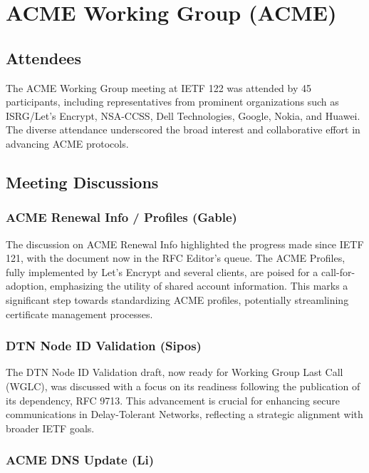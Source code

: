\documentclass{article}
\begin{document}
\section{ACME Working Group (ACME)}

\subsection{Attendees}

The ACME Working Group meeting at IETF 122 was attended by 45 participants, including representatives from prominent organizations such as ISRG/Let's Encrypt, NSA-CCSS, Dell Technologies, Google, Nokia, and Huawei. The diverse attendance underscored the broad interest and collaborative effort in advancing ACME protocols.

\subsection{Meeting Discussions}

\subsubsection{ACME Renewal Info / Profiles (Gable)}

The discussion on ACME Renewal Info highlighted the progress made since IETF 121, with the document now in the RFC Editor's queue. The ACME Profiles, fully implemented by Let's Encrypt and several clients, are poised for a call-for-adoption, emphasizing the utility of shared account information. This marks a significant step towards standardizing ACME profiles, potentially streamlining certificate management processes.

\subsubsection{DTN Node ID Validation (Sipos)}

The DTN Node ID Validation draft, now ready for Working Group Last Call (WGLC), was discussed with a focus on its readiness following the publication of its dependency, RFC 9713. This advancement is crucial for enhancing secure communications in Delay-Tolerant Networks, reflecting a strategic alignment with broader IETF goals.

\subsubsection{ACME DNS Update (Li)}
\end{document}
